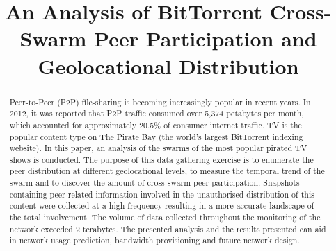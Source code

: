 \documentclass[conference]{IEEEtran}
\begin{document}
\title{An Analysis of BitTorrent Cross-Swarm Peer Participation and Geolocational Distribution}


\author{
\and
{}
}













\maketitle


\begin{abstract}
Peer-to-Peer (P2P) file-sharing is becoming increasingly popular in recent years. In 2012, it was reported that P2P traffic consumed over 5,374 petabytes per month, which accounted for approximately 20.5\% of consumer internet traffic. TV is the popular content type on The Pirate Bay (the world's largest BitTorrent indexing website). In this paper, an analysis of the swarms of the most popular pirated TV shows is conducted. The purpose of this data gathering exercise is to enumerate the peer distribution at different geolocational levels, to measure the temporal trend of the swarm and to discover the amount of cross-swarm peer participation. Snapshots containing peer related information involved in the unauthorised distribution of this content were collected at a high frequency resulting in a more accurate landscape of the total involvement. The volume of data collected throughout the monitoring of the network exceeded 2 terabytes. The presented analysis and the results presented can aid in network usage prediction, bandwidth provisioning and future network design.
\end{abstract}







\IEEEpeerreviewmaketitle
\end{document}
